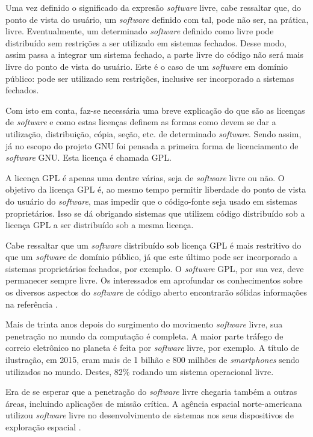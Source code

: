 Uma vez definido o significado da expresão \textit{software} livre, cabe ressaltar que, do ponto de
vista do usuário, um \textit{software} definido com tal, pode não ser, na prática, livre.
Eventualmente, um determinado \textit{software} definido como livre pode distribuído sem
restrições a ser utilizado em sistemas
fechados. Desse modo, assim passa a integrar um sistema fechado, a parte livre do código não será mais livre do ponto de vista do usuário. Este é o caso de um \textit{software} em domínio público: pode ser utilizado sem restrições, inclusive ser incorporado a sistemas fechados.

Com isto em conta, faz-se necessária uma breve explicação do que são as licenças
de \textit{software} e como estas licenças definem as formas como devem se dar a utilização, distribuição, cópia, seção, etc. de determinado \textit{software}. Sendo assim,
já no escopo do projeto GNU \cite{Stallman1985} foi pensada a primeira forma
de licenciamento de \textit{software}
GNU. Esta licença é chamada GPL.

A licença GPL é apenas uma dentre várias, seja de \textit{software} livre ou
não. O objetivo da licença GPL é, ao mesmo tempo permitir liberdade do ponto de vista
do usuário do \textit{software}, mas impedir que o código-fonte seja usado em sistemas proprietários. Isso se dá obrigando sistemas que utilizem código
distribuído sob a licença GPL a ser distribuído sob a mesma licença.

Cabe ressaltar que um \textit{software} distribuído sob licença GPL é mais restritivo do
que um \textit{software} de domínio público, já que este último pode ser incorporado
a sistemas proprietários fechados, por exemplo. O \textit{software} GPL, por sua vez,
deve permanecer sempre livre. Os interessados em aprofundar os conhecimentos sobre
os diversos aspectos do \textit{software} de código aberto encontrarão sólidas informações
na referência \cite{Androutsellis2010}.

Mais de trinta anos depois do surgimento do movimento \textit{software} livre,
sua penetração no mundo da computação é completa. A maior parte tráfego de correio
eletrônico no planeta é feita por \textit{software} livre, por exemplo.  A título
de ilustração, em 2015, eram mais de 1 bilhão e 800 milhões de \textit{smartphones}
sendo utilizados no mundo. Destes, 82\% rodando um sistema operacional livre.

Era de se esperar que a penetração do \textit{software} livre chegaria também a outras
áreas, incluindo aplicações de missão crítica. A agência espacial norte-americana
utilizou \textit{software} livre no desenvolvimento de sistemas nos seus dispositivos
de exploração espacial \cite{Norris2004}.

